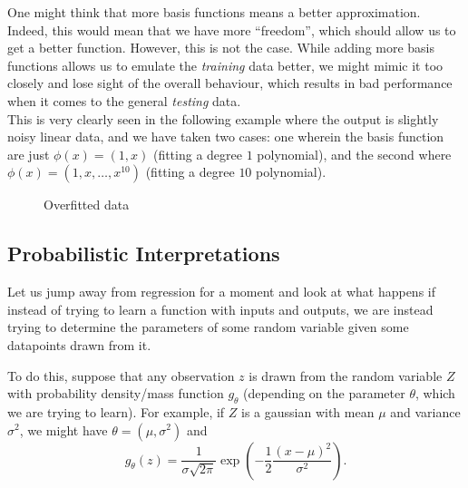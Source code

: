 \documentclass{article}
\begin{document}
		\begin{remark}[Overfitting]
			One might think that more basis functions means a better approximation. Indeed, this would mean that we have more ``freedom'', which should allow us to get a better function. However, this is not the case. While adding more basis functions allows us to emulate the \emph{training} data better, we might mimic it too closely and lose sight of the overall behaviour, which results in bad performance when it comes to the general \emph{testing} data.\\
			This is very clearly seen in the following example where the output is slightly noisy linear data, and we have taken two cases: one wherein the basis function are just $\phi(x) = (1,x)$ (fitting a degree $1$ polynomial), and the second where $\phi(x) = (1,x,\ldots,x^{10})$ (fitting a degree $10$ polynomial).

			\begin{figure}[H]
				\centering
				\caption{Overfitted data}
			\end{figure}
		\end{remark}

	\subsection{Probabilistic Interpretations}

		Let us jump away from regression for a moment and look at what happens if instead of trying to learn a function with inputs and outputs, we are instead trying to determine the parameters of some random variable given some datapoints drawn from it.

		To do this, suppose that any observation $z$ is drawn from the random variable $Z$ with probability density/mass function $g_\theta$ (depending on the parameter $\theta$, which we are trying to learn). For example, if $Z$ is a gaussian with mean $\mu$ and variance $\sigma^2$, we might have $\theta = (\mu,\sigma^2)$ and
		\[ g_\theta(z) = \frac{1}{\sigma\sqrt{2\pi}} \exp\left( -\frac{1}{2} \frac{(x-\mu)^2}{\sigma^2} \right). \]
	
\end{document}
